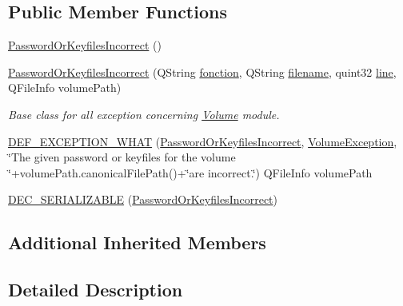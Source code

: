 \subsection*{Public Member Functions}
\begin{DoxyCompactItemize}
\item 
\hyperlink{class_gost_crypt_1_1_volume_1_1_password_or_keyfiles_incorrect_a68f178fc10cd4fec80800557d4250816}{Password\+Or\+Keyfiles\+Incorrect} ()
\item 
\hyperlink{class_gost_crypt_1_1_volume_1_1_password_or_keyfiles_incorrect_aa6dd7961d8b85859db12316ea5b80b2b}{Password\+Or\+Keyfiles\+Incorrect} (Q\+String \hyperlink{class_gost_crypt_1_1_gost_crypt_exception_a29b8c93d5efbb1ff369107385725a939}{fonction}, Q\+String \hyperlink{class_gost_crypt_1_1_gost_crypt_exception_a749a12375f4ba9d502623b99d8252f38}{filename}, quint32 \hyperlink{class_gost_crypt_1_1_gost_crypt_exception_abf506d911f12a4e969eea500f90bd32c}{line}, Q\+File\+Info volume\+Path)
\begin{DoxyCompactList}\small\item\em Base class for all exception concerning \hyperlink{class_gost_crypt_1_1_volume_1_1_volume}{Volume} module. \end{DoxyCompactList}\item 
\hyperlink{class_gost_crypt_1_1_volume_1_1_password_or_keyfiles_incorrect_a6115c764ed87f31dba808c2b8017d0b5}{D\+E\+F\+\_\+\+E\+X\+C\+E\+P\+T\+I\+O\+N\+\_\+\+W\+H\+AT} (\hyperlink{class_gost_crypt_1_1_volume_1_1_password_or_keyfiles_incorrect}{Password\+Or\+Keyfiles\+Incorrect}, \hyperlink{class_gost_crypt_1_1_volume_1_1_volume_exception}{Volume\+Exception}, \char`\"{}The given password or keyfiles for the volume \char`\"{}+volume\+Path.\+canonical\+File\+Path()+\char`\"{}are incorrect.\char`\"{}) Q\+File\+Info volume\+Path
\item 
\hyperlink{class_gost_crypt_1_1_volume_1_1_password_or_keyfiles_incorrect_a102147ce351c7886c3a2c670753a3b25}{D\+E\+C\+\_\+\+S\+E\+R\+I\+A\+L\+I\+Z\+A\+B\+LE} (\hyperlink{class_gost_crypt_1_1_volume_1_1_password_or_keyfiles_incorrect}{Password\+Or\+Keyfiles\+Incorrect})
\end{DoxyCompactItemize}
\subsection*{Additional Inherited Members}


\subsection{Detailed Description}


